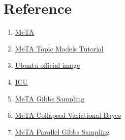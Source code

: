 \documentclass[11pt]{article}
\begin{document}
\section{Reference}

\begin{enumerate}
\item \href{https://meta-toolkit.org/}{MeTA}
\item \href{https://meta-toolkit.org/topic-models-tutorial.html}{MeTA Topic Models Tutorial}
\item \href{https://hub.docker.com/_/ubuntu}{Ubuntu official image}
\item \href{https://github.com/unicode-org/icu}{ICU}
\item \href{https://meta-toolkit.org/doxygen/classmeta_1_1topics_1_1lda__gibbs.html}{MeTA Gibbs Sampling}
\item \href{https://meta-toolkit.org/doxygen/classmeta_1_1topics_1_1lda__cvb.html}{MeTA Collapsed Variational Bayes}
\item \href{https://meta-toolkit.org/doxygen/classmeta_1_1topics_1_1parallel__lda__gibbs.html}{MeTA Parallel Gibbs Sampling}
\end{enumerate}
\end{document}
